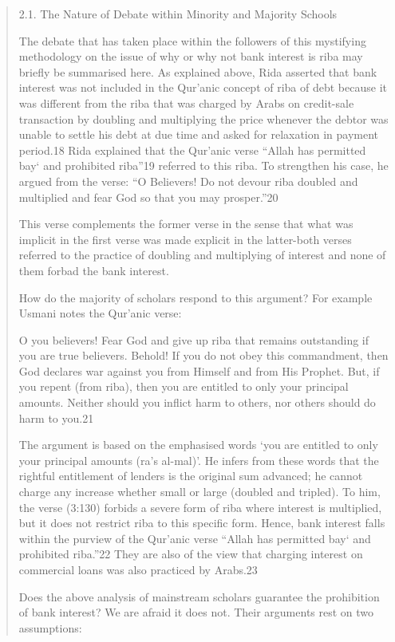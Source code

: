\begin{quote}
2.1. The Nature of Debate within Minority and Majority Schools

The debate that has taken place within the followers of this mystifying methodology on the issue of why or why not bank interest is riba may briefly be summarised here. As explained above, Rida asserted that bank interest was not included in the Qur'anic concept of riba of debt because it was different from the riba that was charged by Arabs on credit-sale transaction by doubling and multiplying the price whenever the debtor was unable to settle his debt at due time and asked for relaxation in payment period.18 Rida explained that the Qur'anic verse “Allah has permitted bay‘ and prohibited riba”19 referred to this riba. To strengthen his case, he argued from the verse: “O Believers! Do not devour riba doubled and multiplied and fear God so that you may prosper.”20

This verse complements the former verse in the sense that what was implicit in the first verse was made explicit in the latter-both verses referred to the practice of doubling and multiplying of interest and none of them forbad the bank interest.

How do the majority of scholars respond to this argument? For example Usmani notes the Qur'anic verse:

O you believers! Fear God and give up riba that remains outstanding if you are true believers. Behold! If you do not obey this commandment, then God declares war against you from Himself and from His Prophet. But, if you repent (from riba), then you are entitled to only your principal amounts. Neither should you inflict harm to others, nor others should do harm to you.21

The argument is based on the emphasised words ‘you are entitled to only your principal amounts (ra's al-mal)'. He infers from these words that the rightful entitlement of lenders is the original sum advanced; he cannot charge any increase whether small or large (doubled and tripled). To him, the verse (3:130) forbids a severe form of riba where interest is multiplied, but it does not restrict riba to this specific form. Hence, bank interest falls within the purview of the Qur'anic verse “Allah has permitted bay‘ and prohibited riba.”22 They are also of the view that charging interest on commercial loans was also practiced by Arabs.23

Does the above analysis of mainstream scholars guarantee the prohibition of bank interest? We are afraid it does not. Their arguments rest on two assumptions:


\end{quote}
